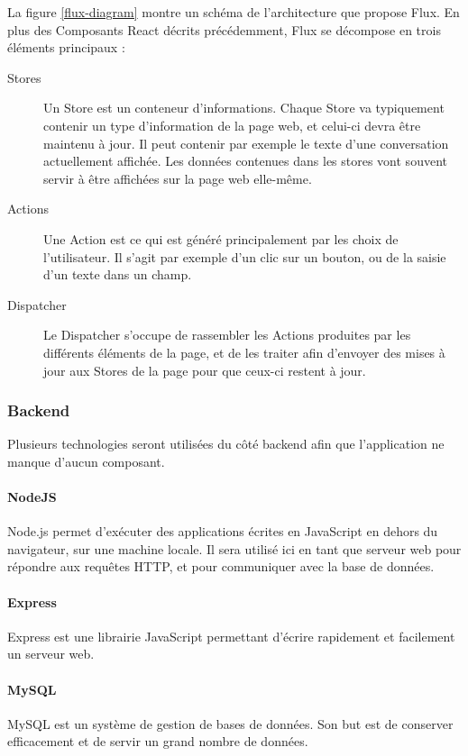 		La figure \ref{flux-diagram} montre un schéma de l'architecture que propose Flux. En plus des Composants React décrits précédemment, Flux se décompose en trois éléments principaux :

		\begin{description}
			\item[Stores] Un Store est un conteneur d'informations. Chaque Store va typiquement contenir un type d'information de la page web, et celui-ci devra être maintenu à jour. Il peut contenir par exemple le texte d'une conversation actuellement affichée. Les données contenues dans les stores vont souvent servir à être affichées sur la page web elle-même.
			\item[Actions] Une Action est ce qui est généré principalement par les choix de l'utilisateur. Il s'agit par exemple d'un clic sur un bouton, ou de la saisie d'un texte dans un champ.
			\item[Dispatcher] Le Dispatcher s'occupe de rassembler les Actions produites par les différents éléments de la page, et de les traiter afin d'envoyer des mises à jour aux Stores de la page pour que ceux-ci restent à jour.
		\end{description}

		\subsubsection{Backend}

			Plusieurs technologies seront utilisées du côté backend afin que l'application ne manque d'aucun composant.

			\paragraph{NodeJS}

			Node.js\cite{nodejs} permet d'exécuter des applications écrites en JavaScript en dehors du navigateur, sur une machine locale. Il sera utilisé ici en tant que serveur web pour répondre aux requêtes HTTP, et pour communiquer avec la base de données.

			\paragraph{Express}

			Express\cite{express} est une librairie JavaScript permettant d'écrire rapidement et facilement un serveur web.

			\paragraph{MySQL}

			MySQL\cite{mysql} est un système de gestion de bases de données. Son but est de conserver efficacement et de servir un grand nombre de données.
